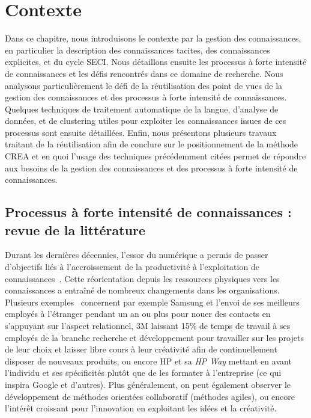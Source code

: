 \chapter{Contexte}
\label{chapter:Contexte}

Dans ce chapitre, nous introduisons le contexte par la gestion des connaissances, en particulier la description des connaissances tacites, des connaissances explicites, et du cycle SECI.
Nous détaillons ensuite les processus à forte intensité de connaissances et les défis rencontrés dans ce domaine de recherche.
Nous analysons particulièrement le défi de la réutilisation des point de vues de la gestion des connaissances et des processus à forte intensité de connaissances.
Quelques techniques de traitement automatique de la langue, d'analyse de données, et de clustering utiles pour exploiter les connaissances issues de ces processus sont ensuite détaillées.
Enfin, nous présentons plusieurs travaux traitant de la réutilisation afin de conclure sur le positionnement de la méthode CREA et en quoi l'usage des techniques précédemment citées permet de répondre aux besoins de la gestion des connaissances et des processus à forte intensité de connaissances.


\bigskip

\minitoc %

\newpage


\section{Processus à forte intensité de connaissances : revue de la littérature}
\label{section:Contexte:KIP-RevueLitterature}

Durant les dernières décennies, l'essor du numérique a permis de passer d'objectifs liés à l'accroissement de la productivité à l'exploitation de connaissances~\cite{north2018knowledge}\cite{syed2018palgrave}.
Cette réorientation depuis les ressources physiques vers les connaissances a entraîné de nombreux changements dans les organisations.
Plusieurs exemples~\cite{harnish2012greatest} concernent par exemple Samsung et l'envoi de ses meilleurs employés à l'étranger pendant un an ou plus pour nouer des contacts en s'appuyant sur l'aspect relationnel, 3M laissant 15\% de temps de travail à ses employés de la branche recherche et développement pour travailler sur les projets de leur choix et laisser libre cours à leur créativité afin de continuellement disposer de nouveaux produits, ou encore HP et sa \og \textit{HP Way} \fg  mettant en avant l'individu et ses spécificités plutôt que de les formater à l'entreprise (ce qui inspira Google et d'autres).
Plus généralement, on peut également observer le développement de méthodes orientées collaboratif (méthodes agiles), ou encore l'intérêt croissant pour l'innovation en exploitant les idées et la créativité.

